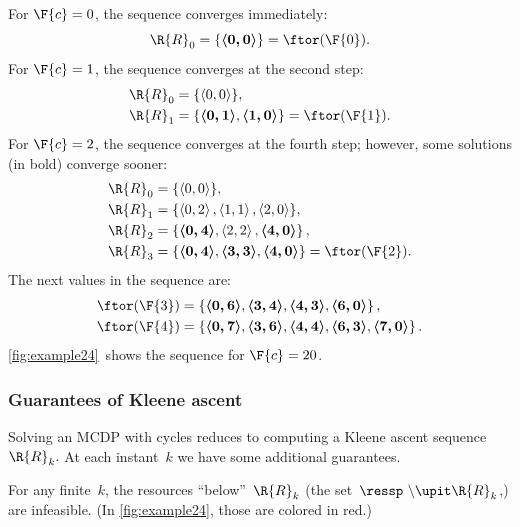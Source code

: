 \noindent For $\F{c}=0$, the sequence converges immediately:
\[
\R{R}_{0}=\{\boldsymbol{\left\langle 0,0\right\rangle }\}=\ftor(\F{0}).
\]
 For $\F{c}=1$, the sequence converges at the second step:
\begin{align*}
\R{R}_{0} & =\{\left\langle 0,0\right\rangle \},\\
\R{R}_{1} & =\{\boldsymbol{\left\langle 0,1\right\rangle },\boldsymbol{\left\langle 1,0\right\rangle }\}=\ftor(\F{1}).
\end{align*}
For $\F{c}=2$, the sequence converges at the fourth step; however,
some solutions (in bold) converge sooner:
\begin{align*}
\R{R}_{0} & =\{\left\langle 0,0\right\rangle \},\\
\R{R}_{1} & =\{\left\langle 0,2\right\rangle ,\left\langle 1,1\right\rangle ,\left\langle 2,0\right\rangle \},\\
\R{R}_{2} & =\left\{ \boldsymbol{\left\langle 0,4\right\rangle },\left\langle 2,2\right\rangle ,\boldsymbol{\left\langle 4,0\right\rangle }\right\} ,\\
\R{R}_{3} & =\{\boldsymbol{\left\langle 0,4\right\rangle },\boldsymbol{\left\langle 3,3\right\rangle },\boldsymbol{\left\langle 4,0\right\rangle }\}=\ftor(\F{2}).
\end{align*}
The next values in the sequence are:
\begin{align*}
\ftor(\F{3}) & =\left\{ \boldsymbol{\left\langle 0,6\right\rangle },\boldsymbol{\left\langle 3,4\right\rangle },\boldsymbol{\left\langle 4,3\right\rangle },\boldsymbol{\left\langle 6,0\right\rangle }\right\} ,\\
\ftor(\F{4}) & =\left\{ \boldsymbol{\left\langle 0,7\right\rangle },\boldsymbol{\left\langle 3,6\right\rangle },\boldsymbol{\left\langle 4,4\right\rangle },\boldsymbol{\left\langle 6,3\right\rangle },\boldsymbol{\left\langle 7,0\right\rangle }\right\} .
\end{align*}
\cref{fig:example24}~shows the sequence for $\F{c}=20$.

\subsubsection{Guarantees of Kleene ascent}

\noindent Solving an MCDP with cycles reduces to computing a Kleene
ascent sequence~$\R{R}_{k}.$ At each instant~$k$ we have some
additional guarantees.

For any finite~$k$, the resources ``below''~$\R{R}_{k}$ (the
set~$\ressp\ \backslash\upit\R{R}_{k}$,) are infeasible. (In \cref{fig:example24},
those are colored in red.)

